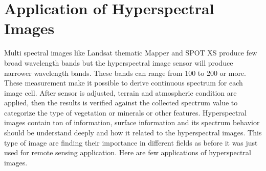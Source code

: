 \documentclass[document.tex]{subfiles}
\begin{document}
\section{Application of Hyperspectral Images}
Multi spectral images like Landsat thematic Mapper and SPOT XS produce few broad wavelength bands but the hyperspectral image sensor will produce narrower wavelength bands. These bands can range from 100 to 200 or more. These measurement make it possible to derive continuous spectrum for each image cell. After sensor is adjusted, terrain and atmospheric condition are applied, then the results is verified against the collected spectrum value to categorize the type of vegetation or minerals or other features. Hyperspectral images contain ton of information, surface information and its spectrum behavior should be understand deeply and how it related to the hyperspectral images. This type of image are finding their importance in different fields as before it was just used for remote sensing application. Here are few applications of hyperspectral images.
\end{document}
